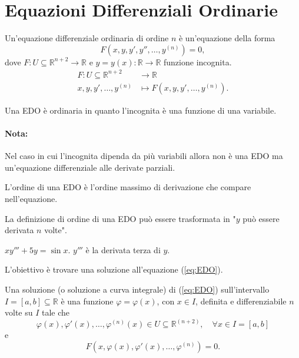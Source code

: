 \section{Equazioni Differenziali Ordinarie}
\begin{definition}
    Un'equazione differenziale ordinaria di ordine $n$ è un'equazione della forma
    \begin{equation}\label{eq:EDO}
        F(x,y,y', y'', \hdots, y^{(n)})=0,
    \end{equation}
    dove $F\colon U\subseteq\mathbb R^{n+2}\rightarrow\mathbb R$ e $y=y(x)\colon\mathbb R\rightarrow\mathbb R$ funzione incognita.
    \begin{align*}
        F\colon U\subseteq\mathbb R^{n+2} & \rightarrow\mathbb R\\
        x,y,y',\hdots, y^{(n)} & \mapsto F(x,y,y', \hdots, y^{(n)}).
    \end{align*}
\end{definition}

\begin{definition}
    Una EDO è ordinaria in quanto l'incognita è una funzione di una variabile.
\end{definition}

\paragraph{Nota:} Nel caso in cui l'incognita dipenda da più variabili allora non è una EDO ma un'equazione differenziale alle derivate parziali.

\begin{definition}
    L'ordine di una EDO è l'ordine massimo di derivazione che compare nell'equazione.
\end{definition}

La definizione di ordine di una EDO può essere trasformata in "$y$ può essere derivata $n$ volte".

\begin{example}
    $xy'''+5y=\sin x$. $y'''$ è la derivata terza di $y$.
\end{example}

L'obiettivo è trovare una soluzione all'equazione (\ref{eq:EDO}).

\begin{definition}\label{def:curva_integrale_EDO}
    Una soluzione (o soluzione a curva integrale) di (\ref{eq:EDO}) sull'intervallo $I=[a,b]\subseteq\mathbb R$ è una funzione $\varphi=\varphi(x)$, con $x\in I$, definita e differenziabile $n$ volte su $I$ tale che
    \begin{equation*}
        \varphi(x),\varphi'(x),\hdots,\varphi^{(n)}(x)\in U\subseteq\mathbb R^{(n+2)},\quad \forall x\in I=[a,b]
    \end{equation*}
    e
    \begin{equation*}
        F(x,\varphi(x),\varphi'(x),\hdots,\varphi^{(n)})=0.
    \end{equation*}
\end{definition}

